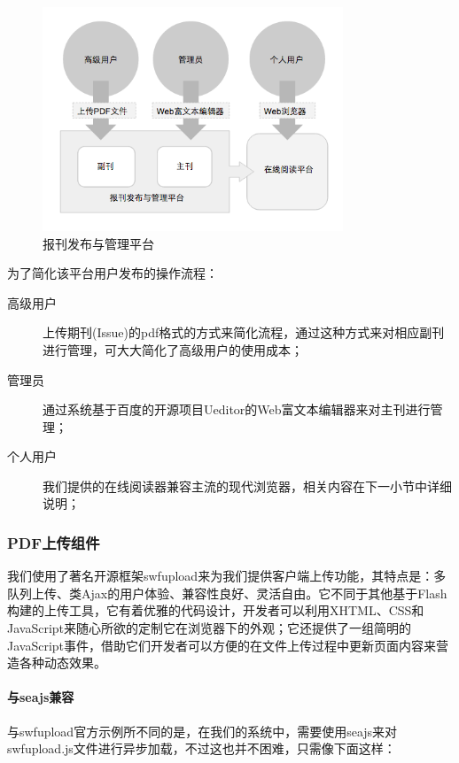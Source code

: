 \begin{figure}[h]
	\centering
		\includegraphics[width=0.8\textwidth]{./images/data-stream-graph.png}
	\caption{报刊发布与管理平台}
\end{figure}

\noindent
为了简化该平台用户发布的操作流程：
\begin{description}
	\item[高级用户] 上传期刊(Issue)的pdf格式的方式来简化流程，通过这种方式来对相应副刊进行管理，可大大简化了高级用户的使用成本；
	\item[管理员] 通过系统基于百度的开源项目Ueditor的Web富文本编辑器来对主刊进行管理；
	\item[个人用户] 我们提供的在线阅读器兼容主流的现代浏览器，相关内容在下一小节中详细说明；
\end{description}

\subsubsection{PDF上传组件}
我们使用了著名开源框架swfupload来为我们提供客户端上传功能，其特点是：多队列上传、类Ajax的用户体验、兼容性良好、灵活自由。它不同于其他基于Flash构建的上传工具，它有着优雅的代码设计，开发者可以利用XHTML、CSS和JavaScript来随心所欲的定制它在浏览器下的外观；它还提供了一组简明的JavaScript事件，借助它们开发者可以方便的在文件上传过程中更新页面内容来营造各种动态效果。

\paragraph{与seajs兼容}
与swfupload官方示例所不同的是，在我们的系统中，需要使用seajs来对swfupload.js文件进行异步加载，不过这也并不困难，只需像下面这样：


